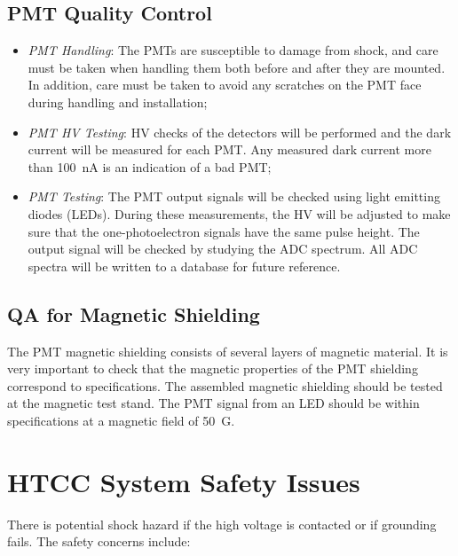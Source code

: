 \subsection{PMT Quality Control}

\begin{itemize}

\item {\it PMT Handling}: The PMTs are susceptible to damage from shock,
and care must be taken when handling them both before and after they
are mounted.  In addition, care must be taken to avoid any scratches on
the PMT face during handling and installation;

\item {\it PMT HV Testing}: HV checks of the detectors will be performed
and the dark current will be measured for each PMT.  Any measured
dark current more than 100~nA is an indication of a bad PMT;

\item {\it PMT Testing}:  The PMT output signals will be checked using 
light emitting diodes (LEDs).  During these measurements, the HV will 
be adjusted to make sure that the one-photoelectron signals have the same 
pulse height.  The output signal will be checked by studying the ADC 
spectrum.  All ADC spectra will be written to a database for future 
reference. 

\end{itemize}

\subsection{QA for Magnetic Shielding}

The PMT magnetic shielding consists of several layers of magnetic material.
It is very important to check that the magnetic properties of the PMT 
shielding correspond to specifications.  The assembled magnetic shielding 
should be tested at the magnetic test stand.  The PMT signal from an LED 
should be within specifications at a magnetic field of 50~G.

\section{HTCC System Safety Issues}

There is potential shock hazard if the high voltage is contacted or if 
grounding fails.  The safety concerns include:

